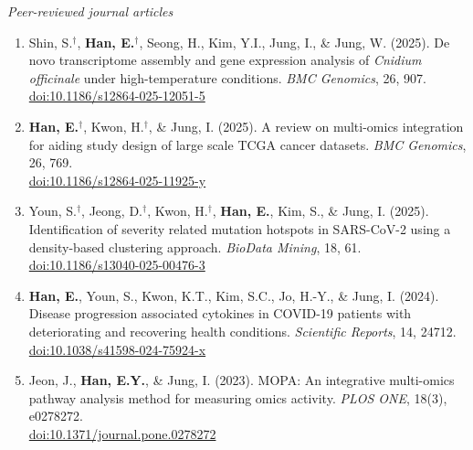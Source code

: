 \documentclass[11pt,a4paper]{article}
\newcommand{\me}[1]{\textbf{#1}}
\newcommand{\subentry}[1]{{\itshape #1}\par}
\begin{document}
\subentry{Peer-reviewed journal articles}
\begin{enumerate}
  \item Shin, S.$^{\dagger}$, \me{Han, E.}$^{\dagger}$, Seong, H., Kim, Y.I., Jung, I., \& Jung, W. (2025).
    De novo transcriptome assembly and gene expression analysis of \emph{Cnidium officinale}
    under high-temperature conditions. \emph{BMC Genomics}, 26, 907.\\
    \href{https://doi.org/10.1186/s12864-025-12051-5}{doi:10.1186/s12864-025-12051-5}
  \item \me{Han, E.}$^{\dagger}$, Kwon, H.$^{\dagger}$, \& Jung, I. (2025).
    A review on multi-omics integration for aiding study design of large scale TCGA
    cancer datasets. \emph{BMC Genomics}, 26, 769.\\
    \href{https://doi.org/10.1186/s12864-025-11925-y}{doi:10.1186/s12864-025-11925-y}
  \item Youn, S.$^{\dagger}$, Jeong, D.$^{\dagger}$, Kwon, H.$^{\dagger}$, \me{Han, E.}, Kim, S., \& Jung, I. (2025).
    Identification of severity related mutation hotspots in SARS-CoV-2 using a
    density-based clustering approach. \emph{BioData Mining}, 18, 61.\\
    \href{https://doi.org/10.1186/s13040-025-00476-3}{doi:10.1186/s13040-025-00476-3}
  \item \me{Han, E.}, Youn, S., Kwon, K.T., Kim, S.C., Jo, H.-Y., \& Jung, I. (2024).
    Disease progression associated cytokines in COVID-19 patients with deteriorating
    and recovering health conditions. \emph{Scientific Reports}, 14, 24712.\\
    \href{https://doi.org/10.1038/s41598-024-75924-x}{doi:10.1038/s41598-024-75924-x}
  \item Jeon, J., \me{Han, E.Y.}, \& Jung, I. (2023).
    MOPA: An integrative multi-omics pathway analysis method for measuring omics
    activity. \emph{PLOS ONE}, 18(3), e0278272.\\
    \href{https://doi.org/10.1371/journal.pone.0278272}{doi:10.1371/journal.pone.0278272}
\end{enumerate}
\end{document}

